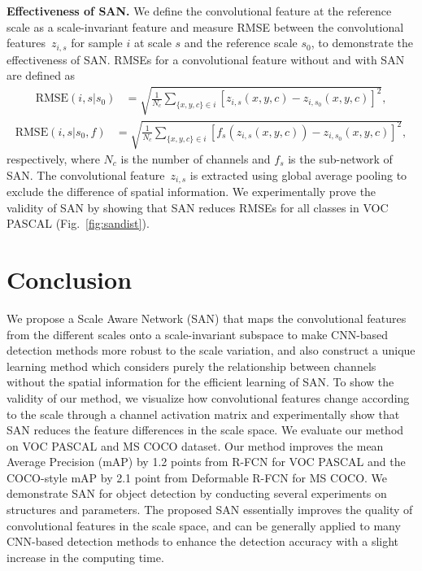 \documentclass[runningheads]{llncs}
\begin{document}
\noindent
\textbf{Effectiveness of SAN.}
We define the convolutional feature at the reference scale as a scale-invariant feature and measure RMSE between the convolutional features~$z_{i,s}$ for sample $i$ at scale $s$ and the reference scale $s_0$, to demonstrate the effectiveness of SAN.
RMSEs for a convolutional feature without and with SAN are defined as
\\
\begin{equation}
\begin{aligned}
\text{RMSE}(i,s|s_0) 		 &= \sqrt{ \frac{1}{N_c} \sum _ {\{x,y,c\} \in i}  \left[ z_{i,s}(x,y,c) - z_{i,s_0}(x,y,c)  \right] ^2 },
\end{aligned}
\end{equation}
\begin{equation}
\begin{aligned}
\text{RMSE}(i,s|s_0,f) &= \sqrt{ \frac{1}{N_c} \sum_ {\{x,y,c\} \in i}  \left[ f_{s} ( z_{i,s}(x,y,c) ) - z_{i,s_0}(x,y,c)  \right] ^2 },
\end{aligned}
\end{equation}
respectively, where $N_c$ is the number of channels and $f_{s}$ is the sub-network of SAN.
The convolutional feature~$z_{i,s}$ is extracted using global average pooling to exclude the difference of spatial information.
We experimentally prove the validity of SAN by showing that SAN reduces RMSEs for all classes in VOC PASCAL (Fig.~\ref{fig:sandist}).


\section{Conclusion}
We propose a Scale Aware Network (SAN) that maps the convolutional features from the different scales onto a scale-invariant subspace to make CNN-based detection methods more robust to the scale variation, and also construct a unique learning method which considers purely the relationship between channels without the spatial information for the efficient learning of SAN.
To show the validity of our method, we visualize how convolutional features change according to the scale through a channel activation matrix and experimentally show that SAN reduces the feature differences in the scale space.
We evaluate our method on VOC PASCAL and MS COCO dataset.
Our method improves the mean Average Precision (mAP) by 1.2 points from R-FCN for VOC PASCAL
and the COCO-style mAP by 2.1 point from Deformable R-FCN for MS COCO.
We demonstrate SAN for object detection by conducting several experiments on structures and parameters.
The proposed SAN essentially improves the quality of convolutional features in the scale space, and can be generally applied to many CNN-based detection methods to enhance the detection accuracy with a slight increase in the computing time.
\end{document}
